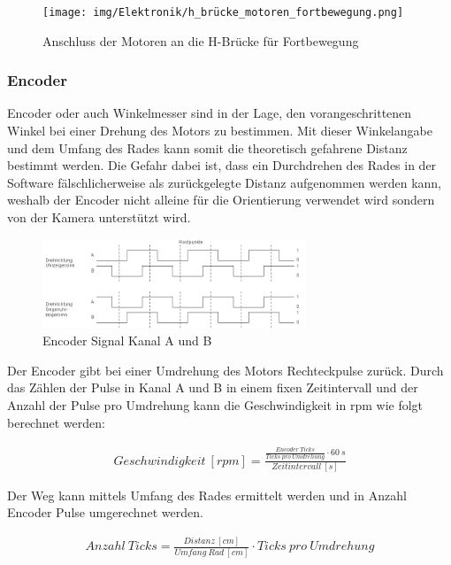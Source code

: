 \begin{figure}[H]
  \texttt{[image: img/Elektronik/h\_brücke\_motoren\_fortbewegung.png]}
  \centering
  \caption{Anschluss der Motoren an die H-Brücke für Fortbewegung}
  \label{fig:hbrücke-fortbeweg}
\end{figure}

\subsubsection{Encoder}
Encoder oder auch Winkelmesser sind in der Lage, den vorangeschrittenen Winkel bei einer Drehung des Motors zu bestimmen. Mit dieser Winkelangabe und dem Umfang des Rades kann somit die theoretisch gefahrene Distanz bestimmt werden. Die Gefahr dabei ist, dass ein Durchdrehen des Rades in der Software fälschlicherweise als zurückgelegte Distanz aufgenommen werden kann, weshalb der Encoder nicht alleine für die Orientierung verwendet wird sondern von der Kamera unterstützt wird.

\begin{figure}[h]
  \includegraphics[width=0.7\textwidth]{img/Elektronik/quadrature.png}
  \centering
  \caption{Encoder Signal Kanal A und B}
  \label{fig:encoder-sig}
\end{figure}

Der Encoder gibt bei einer Umdrehung des Motors Rechteckpulse zurück. Durch das Zählen der Pulse in Kanal A und B in einem fixen Zeitintervall und der Anzahl der Pulse pro Umdrehung kann die Geschwindigkeit in rpm wie folgt berechnet werden:

\begin{align}
    Geschwindigkeit\ [rpm] = \frac{\frac{Encoder\ Ticks}{Ticks\ pro\ Umdrehung} \cdot 60\ s}{Zeitintervall\ [s]}
\end{align}

Der Weg kann mittels Umfang des Rades ermittelt werden und in Anzahl Encoder Pulse umgerechnet werden.

\begin{align}
    Anzahl\ Ticks = \frac{Distanz\ [cm]}{Umfang\ Rad\ [cm]} \cdot Ticks\ pro\ Umdrehung
\end{align}

